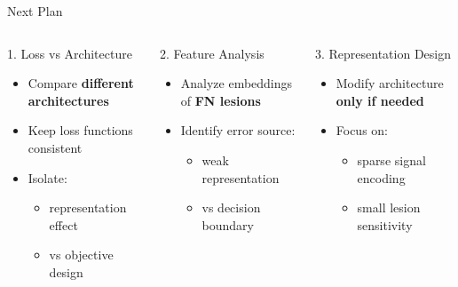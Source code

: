 \documentclass[10pt,aspectratio=169]{beamer}
\begin{document}
\begin{frame}{Next Plan}

\begin{columns}[T,totalwidth=\textwidth]


\begin{block}{1. Loss vs Architecture}
\small
\begin{itemize}
  \item Compare \textbf{different architectures}
  \item Keep loss functions consistent
  \item Isolate:
  \begin{itemize}
    \item representation effect
    \item vs objective design
  \end{itemize}
\end{itemize}
\end{block}

\vspace{0.25cm}

\begin{block}{2. Feature Analysis}
\small
\begin{itemize}
  \item Analyze embeddings of \textbf{FN lesions}
  \item Identify error source:
  \begin{itemize}
    \item weak representation
    \item vs decision boundary
  \end{itemize}
\end{itemize}
\end{block}



\begin{block}{3. Representation Design}
\small
\begin{itemize}
  \item Modify architecture \textbf{only if needed}
  \item Focus on:
  \begin{itemize}
    \item sparse signal encoding
    \item small lesion sensitivity
  \end{itemize}
\end{itemize}
\end{block}

\end{columns}

\end{frame}
\end{document}
